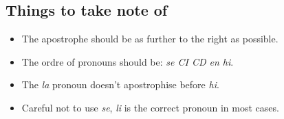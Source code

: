 \documentclass{article}
\begin{document}
\subsection*{Things to take note of}

\begin{itemize}
    \item The apostrophe should be as further to the right as possible.
    \item The ordre of pronouns should be: \emph{se CI CD en hi}.
    \item The \emph{la} pronoun doesn't apostrophise before \emph{hi}.
    \item Careful not to use \emph{se}, \emph{li} is the correct pronoun in most
    cases.
\end{itemize}
\end{document}
